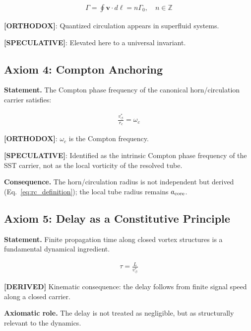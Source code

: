 \documentclass[11pt]{article}
\theoremstyle{definition}
\theoremstyle{plain}
\theoremstyle{remark}
\newcommand{\rc}{{r_c}}
\newcommand{\vchar}{v_{\!\boldsymbol{\circlearrowleft}}^{\ast}}
\begin{document}
        \begin{align}
            \Gamma = \oint \mathbf{v} \cdot d\ell = n \Gamma_0, \quad n \in \mathbb{Z}
        \end{align}
        
        \textbf{[ORTHODOX]}: Quantized circulation appears in superfluid systems.
        
        \textbf{[SPECULATIVE]}: Elevated here to a universal invariant.
    
    \subsection{Axiom 4: Compton Anchoring}
        
        \textbf{Statement.}
        The Compton phase frequency of the canonical horn/circulation carrier satisfies:
        
        \begin{align}
            \frac{\vchar}{\rc} = \omega_c
        \end{align}
        
        \textbf{[ORTHODOX]}: $\omega_c$ is the Compton frequency.
        
        \textbf{[SPECULATIVE]}: Identified as the intrinsic Compton phase frequency of the SST carrier, not as the local vorticity of the resolved tube.
        
        \textbf{Consequence.}
        The horn/circulation radius is not independent but derived (Eq.~\ref{eq:rc_definition}); the local tube radius remains $a_{\rm core}$.
    
    \subsection{Axiom 5: Delay as a Constitutive Principle}
        
        \textbf{Statement.}
        Finite propagation time along closed vortex structures is a fundamental dynamical ingredient.
        
        \begin{align}
            \tau = \frac{L}{\vchar}
        \end{align}
        
        \textbf{[DERIVED]} Kinematic consequence: the delay follows from finite signal speed along a closed carrier.

        \textbf{Axiomatic role.} The delay is not treated as negligible, but as structurally relevant to the dynamics.
        
\end{document}
